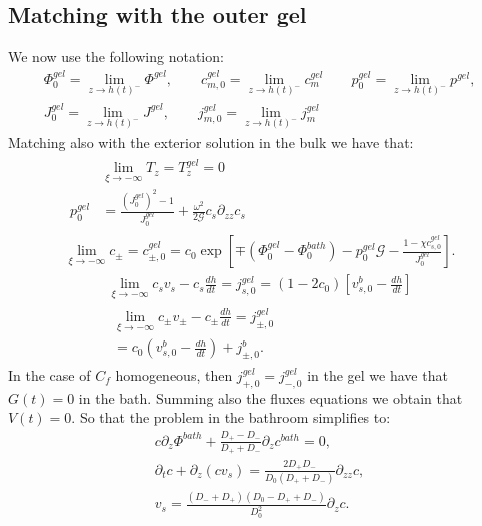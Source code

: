 \documentclass[12pt]{extarticle}
\begin{document}
\subsection{Matching with the outer gel}
We now use the following notation:
\begin{equation}
\begin{aligned}
\Phi^{gel}_0=\lim_{z\rightarrow h(t)^-} \Phi^{gel}, \qquad c^{gel}_{m,0}=\lim_{z\rightarrow h(t)^-} c^{gel}_{m} \qquad p_0^{gel}=\lim_{z\rightarrow h(t)^-} p^{gel},\\
J^{gel}_0=\lim_{z\rightarrow h(t)^-} J^{gel}, \qquad j^{gel}_{m,0}=\lim_{z\rightarrow h(t)^-} j^{gel}_m
\end{aligned}
\end{equation}
Matching also with the exterior solution in the bulk we have that:
\begin{gather}
\begin{aligned}
&\lim_{\xi\rightarrow -\infty} T_z = T^{gel}_z =0 \\
p^{gel}_0& =  \frac{(J^{gel}_0)^2-1}{J^{gel}_0}+\frac{\omega^2}{2\mathcal{G}} c_s\partial_{zz}c_s\label{eq1}
\end{aligned}\\
\lim_{\xi\rightarrow -\infty} c_\pm = c^{gel}_{\pm,0} = c_0\exp\left[\mp(\Phi^{gel}_0-\Phi_0^{bath})-p_0^{gel}\mathcal{G}-\frac{1-\chi c^{gel}_{s,0}}{J^{gel}_0}\right].
\end{gather}
\begin{gather}
\lim_{\xi\rightarrow -\infty} c_s v_s - c_s \frac{dh}{dt}= j^{gel}_{s,0} =(1-2c_0)\left[v^b_{s,0}-\frac{dh}{dt}\right]\\
\begin{aligned}
\lim_{\xi\rightarrow -\infty}c_\pm v_\pm - c_\pm \frac{dh}{dt}=j^{gel}_{\pm,0}\\
=c_0\left(v^b_{s,0}-\frac{dh}{dt}\right)+j^b_{\pm,0}.
\end{aligned}
\end{gather}
In the case of $C_f$ homogeneous, then $j^{gel}_{+,0}=j^{gel}_{-,0}$ in the gel we have that $G(t)=0$ in the bath. Summing also the fluxes equations we obtain that $V(t)=0$. So that the problem in the bathroom simplifies to:
\begin{eqnarray}
c\partial_z\Phi^{bath}+\frac{D_+-D_-}{D_++D_-}\partial_zc^{bath}=0,\label{A}\\
\partial_t c + \partial_z\left(cv_s\right)=\frac{2D_+D_-}{D_0(D_++D_-)}\partial_{zz}c,\\[2mm]
v_s=\frac{(D_-+D_+)(D_0-D_++D_-)}{D^2_0}\partial_z c. \label{B}
\end{eqnarray}
\end{document}
